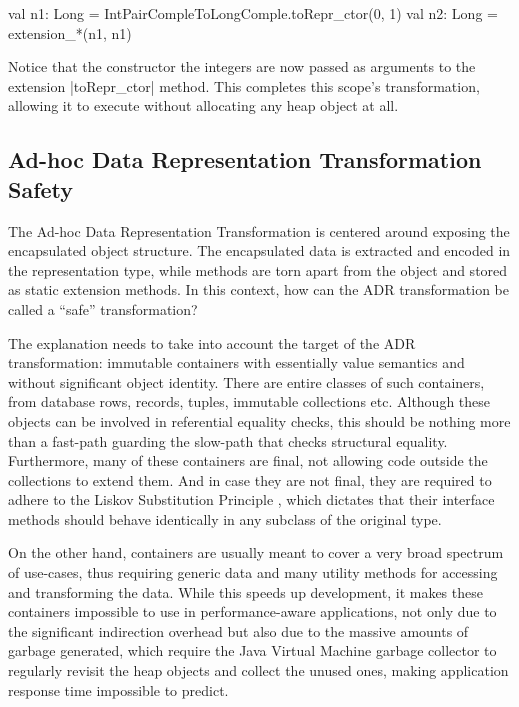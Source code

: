 \begin{lstlisting-nobreak}
val n1: Long = IntPairCompleToLongComple.toRepr_ctor(0, 1)
val n2: Long = extension_*(n1, n1)
\end{lstlisting-nobreak}

Notice that the constructor the integers are now passed as arguments to the extension |toRepr_ctor| method. This completes this scope's transformation, allowing it to execute without allocating any heap object at all.

\subsection{Ad-hoc Data Representation Transformation Safety}

The Ad-hoc Data Representation Transformation is centered around exposing the encapsulated object structure. The encapsulated data is extracted and encoded in the representation type, while methods are torn apart from the object and stored as static extension methods. In this context, how can the ADR transformation be called a ``safe'' transformation?

The explanation needs to take into account the target of the ADR transformation: immutable containers with essentially value semantics and without significant object identity. There are entire classes of such containers, from database rows, records, tuples, immutable collections etc. Although these objects can be involved in referential equality checks, this should be nothing more than a fast-path guarding the slow-path that checks structural equality. Furthermore, many of these containers are final, not allowing code outside the collections to extend them. And in case they are not final, they are required to adhere to the Liskov Substitution Principle \cite{liskov-substitution-principle}, which dictates that their interface methods should behave identically in any subclass of the original type.

On the other hand, containers are usually meant to cover a very broad spectrum of use-cases, thus requiring generic data and many utility methods for accessing and transforming the data. While this speeds up development, it makes these containers impossible to use in performance-aware applications, not only due to the significant indirection overhead but also due to the massive amounts of garbage generated, which require the Java Virtual Machine garbage collector to regularly revisit the heap objects and collect the unused ones, making application response time impossible to predict.

